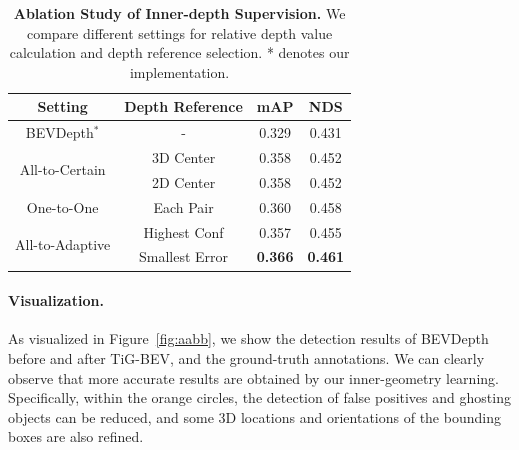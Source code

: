 \begin{table}[t!]
    \centering
    \caption{\textbf{Ablation Study of Inner-depth Supervision.} We compare different settings for relative depth value calculation and depth reference selection. * denotes our implementation.}
    \resizebox{1\columnwidth}{!}
    {
    \begin{tabular}{c|c|cc}
    \toprule[1.2pt]
          Setting &Depth Reference & mAP&NDS  \\
          \midrule
          BEVDepth$^*$ & - & 0.329 & 0.431 \\
          \midrule
        \multirow{2}{*}{All-to-Certain}& 3D Center  & 0.358         & 0.452 \\ 
             &2D Center  & 0.358        & 0.452 \\
             \midrule
             One-to-One &Each Pair & 0.360     & 0.458 \\
             \midrule
         \multirow{2}{*}{All-to-Adaptive}&Highest Conf & 0.357         & 0.455 \\
              
              &Smallest Error & \textbf{0.366}         & \textbf{0.461} \\
    \bottomrule[1.2pt]
    \end{tabular}}
    \label{tab:relative_ablation}
\end{table}

\paragraph{Visualization.} 
As visualized in Figure~\ref{fig:aabb}, we show the detection results of BEVDepth before and after TiG-BEV, and the ground-truth annotations. We can clearly observe that more accurate results are obtained by our inner-geometry learning. Specifically, within the orange circles, the detection of false positives and ghosting objects can be reduced, and some 3D locations and orientations of the bounding boxes are also refined.
%

